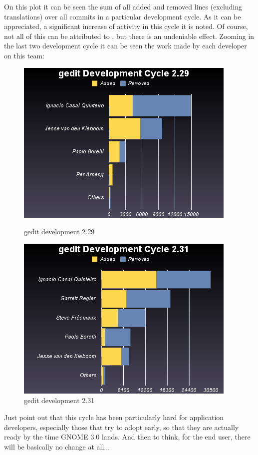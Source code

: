 
On this plot it can be seen the sum of all added and removed lines (excluding translations) over all commits in a particular development cycle. As it can be appreciated, a significant increase of activity in this cycle it is noted. Of course, not all of this can be attributed to , but there is an undeniable effect. Zooming in the last two development cycle it can be seen the work made by each developer on this team:

\begin{figure}[H]
  \begin{minipage}[b]{0.5\linewidth}
    \centering
    \includegraphics[scale=0.45]{./images/gedit-development-2-29}
    \caption{gedit development 2.29}
  \end{minipage}
  \hspace{0.5cm}
  \begin{minipage}[b]{0.5\linewidth}
    \centering
    \includegraphics[scale=0.45]{./images/gedit-development-2-31}
    \caption{gedit development 2.31}
  \end{minipage}
\end{figure}

Just point out that this cycle has been particularly hard for application developers, especially those that try to adopt early, so that they are actually ready by the time GNOME 3.0 lands. And then to think, for the end user, there will be basically no change at all...
